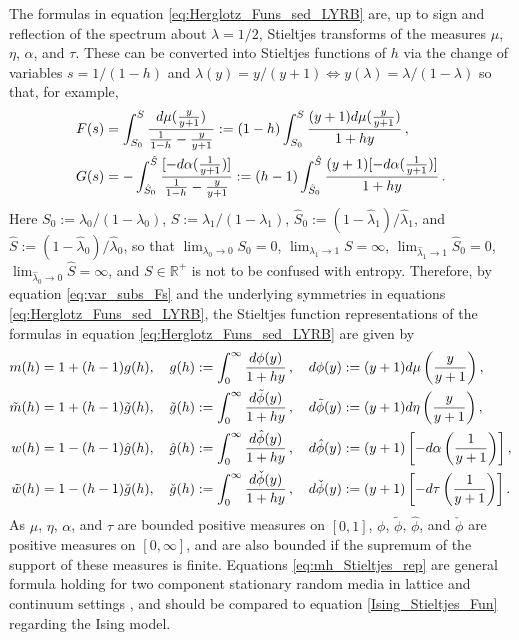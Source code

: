 \documentclass[english,12pt]{ttuthes}
\newcommand{\ph}{\hat{\phi}}
\begin{document}
The formulas in equation \eqref{eq:Herglotz_Funs_sed_LYRB} are, up to
sign and reflection of the spectrum about $\lambda=1/2$, Stieltjes
transforms of the measures $\mu$, $\eta$, $\alpha$, and $\tau$. These can be
converted into Stieltjes functions \cite{Baker-1990} of $h$ via the
change of variables $s=1/(1-h)$ and $\lambda(y)=y/(y+1)\iff y(\lambda)=\lambda/(1-\lambda)$ so
that, for example,  
%
\begin{align}\label{eq:var_subs_Fs}
  F(s)&=\int_{S_0}^{S}\frac{d\mu(\frac{y}{y+1})}
                {\frac{1}{1-h}-\frac{y}{y+1}}
                :=(1-h)\int_{S_0}^{S}\frac{(y+1)d\mu(\frac{y}{y+1})}{1+hy}
                \,,  \notag\\
  G(s)&=-\int_{\hat{S}_0}^{\hat{S}}\frac{[-d\alpha(\frac{1}{y+1})]}
                {\frac{1}{1-h}-\frac{y}{y+1}}
                :=(h-1)\int_{\hat{S}_0}^{\hat{S}}\frac{(y+1)[-d\alpha(\frac{1}{y+1})]}{1+hy}
                \,.               
\end{align}    
%
Here $S_0:=\lambda_0/(1-\lambda_0)$, $S:=\lambda_1/(1-\lambda_1)$,
$\hat{S}_0:=(1-\hat{\lambda}_1)/\hat{\lambda}_1$, and $\hat{S}:=(1-\hat{\lambda}_0)/\hat{\lambda}_0$,
so that $\lim_{\lambda_0\to0}S_0=0$, $\lim_{\lambda_1\to1}S=\infty$,
$\lim_{\hat{\lambda}_1\to1}\hat{S}_0=0$, $\lim_{\hat{\lambda}_0\to0}\hat{S}=\infty$, and
$S\in\mathbb{R}^+$ is not to be confused with entropy. Therefore, by
equation \eqref{eq:var_subs_Fs} and the underlying symmetries in
equations \eqref{eq:Herglotz_Funs_sed_LYRB}, the Stieltjes function
representations of the formulas in equation
\eqref{eq:Herglotz_Funs_sed_LYRB} are given by         
% 
\begin{align}\label{eq:mh_Stieltjes_rep} 
    m(h)&=1+(h-1)g(h),\quad
    g(h):=\int_0^\infty\frac{d\phi(y)}{1+hy}\,, \quad
    d\phi(y):=(y+1)d\mu\left(\frac{y}{y+1}\right),\notag \\
%     
    \tilde{m}(h)&=1+(h-1)\tilde{g}(h), \quad
    \tilde{g}(h):=\int_0^\infty\frac{d\tilde{\phi}(y)}{1+hy}\,,\quad
    d\tilde{\phi}(y):=(y+1)d\eta\left(\frac{y}{y+1}\right),\notag \\
%    
     w(h)&=1-(h-1)\hat{g}(h),\quad
     \hat{g}(h):=\int_0^\infty\frac{d\ph(y)}{1+hy}\,, \quad
     d\ph(y):=(y+1)\left[-d\alpha\left(\frac{1}{y+1}\right)\right],\notag \\
%     
    \tilde{w}(h)&=1-(h-1)\check{g}(h),
      \quad \check{g}(h):=\int_0^\infty\frac{d\check{\phi}(y)}{1+hy}\,,\quad
      d\check{\phi}(y):=(y+1)\left[-d\tau\left(\frac{1}{y+1}\right)\right].
\end{align}
%
As $\mu$, $\eta$, $\alpha$, and $\tau$ are bounded positive measures on
$[0,1]$, $\phi$, $\tilde{\phi}$, $\ph$, and $\check{\phi}$ are positive
measures on $[0,\infty]$, and are also bounded if the supremum of the
support of these measures is finite. Equations
\eqref{eq:mh_Stieltjes_rep} are general formula holding for two
component stationary random media in lattice and continuum settings
\cite{Golden:PRL-3935}, and should be compared to equation
\eqref{Ising_Stieltjes_Fun} regarding the Ising model.       
\end{document}
